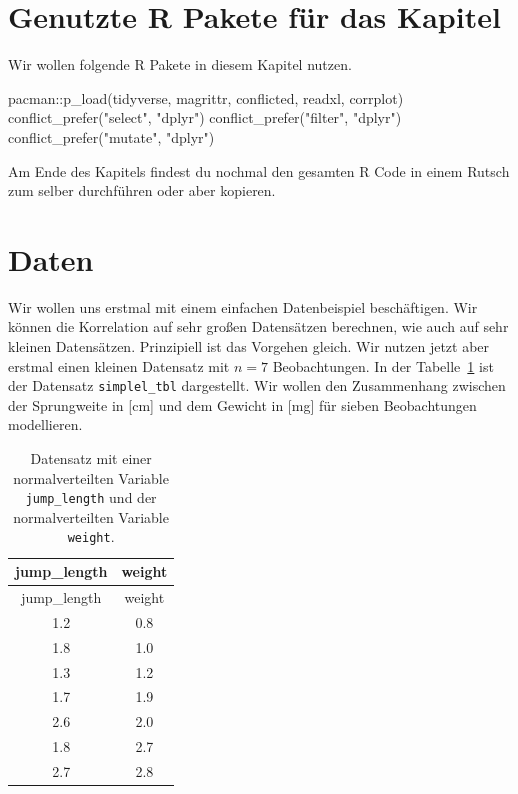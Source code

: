 \documentclass[
  letterpaper,
]{scrbook}
\newenvironment{Shaded}{\begin{snugshade}}{\end{snugshade}}
\newcommand{\FunctionTok}[1]{\textcolor[rgb]{0.28,0.35,0.67}{#1}}
\newcommand{\NormalTok}[1]{\textcolor[rgb]{0.00,0.23,0.31}{#1}}
\newcommand{\SpecialCharTok}[1]{\textcolor[rgb]{0.37,0.37,0.37}{#1}}
\newcommand{\StringTok}[1]{\textcolor[rgb]{0.13,0.47,0.30}{#1}}
\begin{document}
\hypertarget{genutzte-r-pakete-fuxfcr-das-kapitel-17}{%
\section{Genutzte R Pakete für das
Kapitel}\label{genutzte-r-pakete-fuxfcr-das-kapitel-17}}

Wir wollen folgende R Pakete in diesem Kapitel nutzen.

\begin{Shaded}
\begin{Highlighting}[]
\NormalTok{pacman}\SpecialCharTok{::}\FunctionTok{p\_load}\NormalTok{(tidyverse, magrittr, conflicted, readxl,}
\NormalTok{               corrplot)}
\FunctionTok{conflict\_prefer}\NormalTok{(}\StringTok{"select"}\NormalTok{, }\StringTok{"dplyr"}\NormalTok{)}
\FunctionTok{conflict\_prefer}\NormalTok{(}\StringTok{"filter"}\NormalTok{, }\StringTok{"dplyr"}\NormalTok{)}
\FunctionTok{conflict\_prefer}\NormalTok{(}\StringTok{"mutate"}\NormalTok{, }\StringTok{"dplyr"}\NormalTok{)}
\end{Highlighting}
\end{Shaded}

Am Ende des Kapitels findest du nochmal den gesamten R Code in einem
Rutsch zum selber durchführen oder aber kopieren.

\hypertarget{daten-5}{%
\section{Daten}\label{daten-5}}

Wir wollen uns erstmal mit einem einfachen Datenbeispiel beschäftigen.
Wir können die Korrelation auf sehr großen Datensätzen berechnen, wie
auch auf sehr kleinen Datensätzen. Prinzipiell ist das Vorgehen gleich.
Wir nutzen jetzt aber erstmal einen kleinen Datensatz mit \(n=7\)
Beobachtungen. In der Tabelle~\ref{tbl-corr-0} ist der Datensatz
\texttt{simplel\_tbl} dargestellt. Wir wollen den Zusammenhang zwischen
der Sprungweite in {[}cm{]} und dem Gewicht in {[}mg{]} für sieben
Beobachtungen modellieren.

\hypertarget{tbl-corr-0}{}
\begin{longtable}[]{@{}cc@{}}
\caption{\label{tbl-corr-0}Datensatz mit einer normalverteilten Variable
\texttt{jump\_length} und der normalverteilten Variable
\texttt{weight}.}\tabularnewline
\toprule()
jump\_length & weight \\
\midrule()
\endfirsthead
\toprule()
jump\_length & weight \\
\midrule()
\endhead
1.2 & 0.8 \\
1.8 & 1.0 \\
1.3 & 1.2 \\
1.7 & 1.9 \\
2.6 & 2.0 \\
1.8 & 2.7 \\
2.7 & 2.8 \\
\bottomrule()
\end{longtable}
\end{document}

